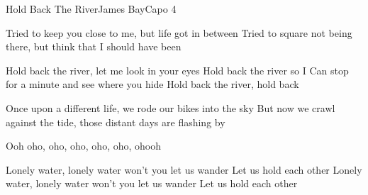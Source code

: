 \begin{song}{Hold Back The River}{James Bay}{Capo 4}

Tried to keep you close to me, but life got in between
Tried to square not being there, but think that I should have been

Hold back the river, let me look in your eyes
Hold back the river so I
Can stop for a minute and see where you hide
Hold back the river, hold back

Once upon a different life, we rode our bikes into the sky
But now we crawl against the tide, those distant days are flashing by

 

Ooh oho, oho, oho, oho, oho, ohooh

Lonely water, lonely water won't you let us wander
Let us hold each other
Lonely water, lonely water won't you let us wander
Let us hold each other

 

 
\end{song}
